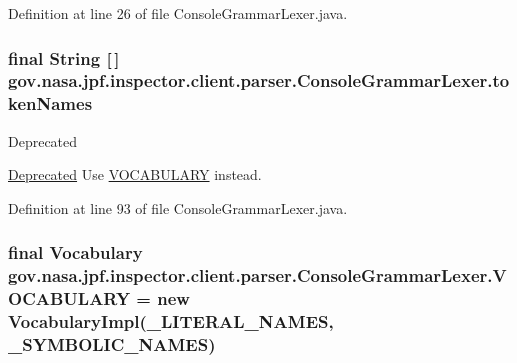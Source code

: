 Definition at line 26 of file Console\+Grammar\+Lexer.\+java.

\subsubsection[{\texorpdfstring{token\+Names}{tokenNames}}]{\setlength{\rightskip}{0pt plus 5cm}final String \mbox{[}$\,$\mbox{]} gov.\+nasa.\+jpf.\+inspector.\+client.\+parser.\+Console\+Grammar\+Lexer.\+token\+Names\hspace{0.3cm}{\ttfamily [static]}}\hypertarget{classgov_1_1nasa_1_1jpf_1_1inspector_1_1client_1_1parser_1_1_console_grammar_lexer_ab8ed49d16553f8cf1819cb328b912a5d}{}\label{classgov_1_1nasa_1_1jpf_1_1inspector_1_1client_1_1parser_1_1_console_grammar_lexer_ab8ed49d16553f8cf1819cb328b912a5d}
\begin{DoxyRefDesc}{Deprecated}
\item[\hyperlink{deprecated__deprecated000001}{Deprecated}]Use \hyperlink{classgov_1_1nasa_1_1jpf_1_1inspector_1_1client_1_1parser_1_1_console_grammar_lexer_aef69b636e123dab0c5baa2e315cb4928}{V\+O\+C\+A\+B\+U\+L\+A\+RY} instead.\end{DoxyRefDesc}


Definition at line 93 of file Console\+Grammar\+Lexer.\+java.

\subsubsection[{\texorpdfstring{V\+O\+C\+A\+B\+U\+L\+A\+RY}{VOCABULARY}}]{\setlength{\rightskip}{0pt plus 5cm}final Vocabulary gov.\+nasa.\+jpf.\+inspector.\+client.\+parser.\+Console\+Grammar\+Lexer.\+V\+O\+C\+A\+B\+U\+L\+A\+RY = new Vocabulary\+Impl({\bf \+\_\+\+L\+I\+T\+E\+R\+A\+L\+\_\+\+N\+A\+M\+ES}, {\bf \+\_\+\+S\+Y\+M\+B\+O\+L\+I\+C\+\_\+\+N\+A\+M\+ES})\hspace{0.3cm}{\ttfamily [static]}}\hypertarget{classgov_1_1nasa_1_1jpf_1_1inspector_1_1client_1_1parser_1_1_console_grammar_lexer_aef69b636e123dab0c5baa2e315cb4928}{}\label{classgov_1_1nasa_1_1jpf_1_1inspector_1_1client_1_1parser_1_1_console_grammar_lexer_aef69b636e123dab0c5baa2e315cb4928}


